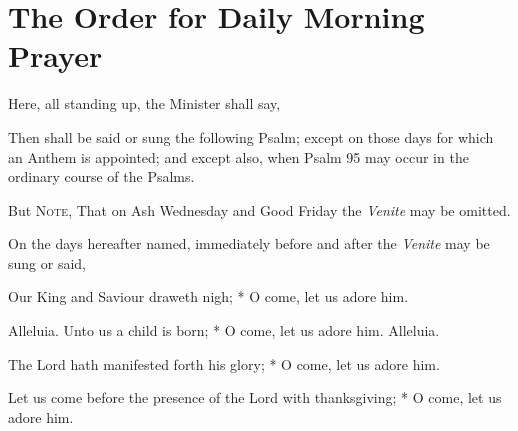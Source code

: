 \section{The Order for Daily Morning Prayer}
\begin{rubric}
    Here, all standing up, the Minister shall say,
\end{rubric}
\begin{rubric}
    Then shall be said or sung the following Psalm; except on those days for which an Anthem is appointed; and except also, when Psalm 95 may occur in the ordinary course of the Psalms.
\end{rubric}
\begin{rubric}
    But \textsc{Note}, That on Ash Wednesday and Good Friday the \emph{Venite} may be omitted.
\end{rubric}
\begin{rubric}
    On the days hereafter named, immediately before and after the \emph{Venite} may be sung or said,
\end{rubric}
\par\noindent
{} Our King and Saviour draweth nigh; * O come, let us adore him.
\par\noindent
{} Alleluia. Unto us a child is born; * O come, let us adore him. Alleluia.
\par\noindent
{} The Lord hath manifested forth his glory; * O come, let us adore him.
\par\noindent
 Let us come before the presence of the Lord with thanksgiving;  * O come, let us adore him.
\par\noindent
